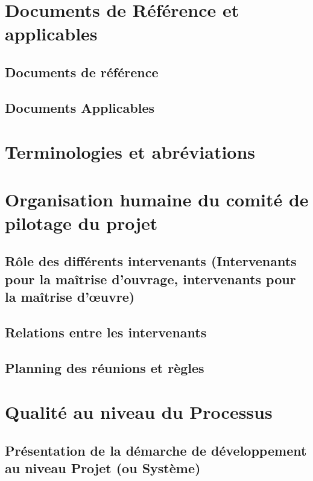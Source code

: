\documentclass[a4paper]{article}
\begin{document}
\section{Documents de Référence et applicables}


\subsection{Documents de référence}

\subsection{Documents Applicables}

\section{Terminologies et abréviations}

\section{Organisation humaine du comité de pilotage du projet}

\subsection{Rôle des différents intervenants (Intervenants pour la maîtrise d'ouvrage, intervenants pour la maîtrise d'œuvre)}

\subsection{Relations entre les intervenants}

\subsection{Planning des réunions et règles}

\section{Qualité au niveau du Processus}

\subsection{Présentation de la démarche de développement au niveau Projet (ou Système)}
\end{document}
